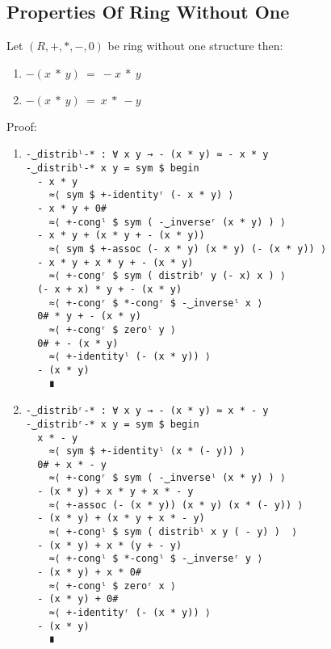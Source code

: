 \subsection{Properties Of Ring Without One}
Let $(R, +, *, -, 0)$ be ring without one structure then:
\begin{enumerate}
\item \(- (x\ *\ y)\ =\ - x\ *\ y\)
\item \(- (x\ *\ y)\ =\ x\ *\ - y\)
\end{enumerate}
Proof:
\begin{enumerate}
\item
\begin{verbatim}
-‿distribˡ-* : ∀ x y → - (x * y) ≈ - x * y
-‿distribˡ-* x y = sym $ begin
  - x * y                        
	≈⟨ sym $ +-identityʳ (- x * y) ⟩
  - x * y + 0#                   
	≈⟨ +-congˡ $ sym ( -‿inverseʳ (x * y) ) ⟩
  - x * y + (x * y + - (x * y))  
	≈⟨ sym $ +-assoc (- x * y) (x * y) (- (x * y)) ⟩
  - x * y + x * y + - (x * y)    
	≈⟨ +-congʳ $ sym ( distribʳ y (- x) x ) ⟩
  (- x + x) * y + - (x * y)      
	≈⟨ +-congʳ $ *-congʳ $ -‿inverseˡ x ⟩
  0# * y + - (x * y)             
	≈⟨ +-congʳ $ zeroˡ y ⟩
  0# + - (x * y)                 
	≈⟨ +-identityˡ (- (x * y)) ⟩
  - (x * y)                      
	∎
\end{verbatim}
\item
\begin{verbatim}
-‿distribʳ-* : ∀ x y → - (x * y) ≈ x * - y
-‿distribʳ-* x y = sym $ begin
  x * - y                        
	≈⟨ sym $ +-identityˡ (x * (- y)) ⟩
  0# + x * - y                   
	≈⟨ +-congʳ $ sym ( -‿inverseˡ (x * y) ) ⟩
  - (x * y) + x * y + x * - y    
	≈⟨ +-assoc (- (x * y)) (x * y) (x * (- y)) ⟩
  - (x * y) + (x * y + x * - y)  
	≈⟨ +-congˡ $ sym ( distribˡ x y ( - y) )  ⟩
  - (x * y) + x * (y + - y)      
	≈⟨ +-congˡ $ *-congˡ $ -‿inverseʳ y ⟩
  - (x * y) + x * 0#             
	≈⟨ +-congˡ $ zeroʳ x ⟩
  - (x * y) + 0#                 
	≈⟨ +-identityʳ (- (x * y)) ⟩
  - (x * y)                      
	∎
\end{verbatim}
\end{enumerate}
